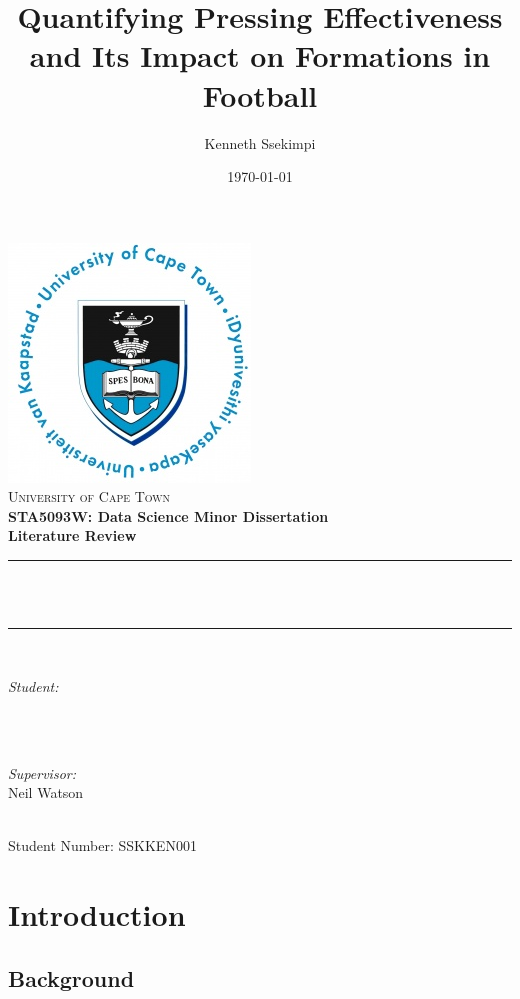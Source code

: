 \documentclass[12pt]{article}
\title{Quantifying Pressing Effectiveness and Its Impact on Formations in Football}
\author{Kenneth Ssekimpi}
\date{\today}
\makeatletter
\let\thetitle\@title
\let\theauthor\@author
\makeatother
\begin{document}

\begin{titlepage}
        \centering
    \vspace*{0.5 cm}
    \includegraphics[scale = 0.75]{UCT Logo.jpg}\\[1.0 cm]
    \textsc{\LARGE University of Cape Town}\\[0.5 cm]	%
    \textbf{\Large STA5093W: Data Science Minor Dissertation}\\[0.5 cm]				%
	\textbf{\large Literature Review}\\[0.5 cm]				%
	\rule{\linewidth}{0.2 mm} \\[0.4 cm]
	{ \huge \bfseries \thetitle}\\
	\rule{\linewidth}{0.2 mm} \\[1.5 cm]
	
	\begin{minipage}{0.4\textwidth}
		\begin{flushleft} \large
			\emph{Student:}\\
			\theauthor \\
			\end{flushleft}
			\end{minipage}~
			\begin{minipage}{0.4\textwidth}
			\begin{flushright} \large
			\emph{Supervisor:} \\
			Neil Watson									
		\end{flushright}
	\end{minipage}\\[2 cm]

Student Number: SSKKEN001 \\

	
\end{titlepage}

\tableofcontents
\pagebreak

\section{Introduction}


\subsection{Background}
\end{document}
